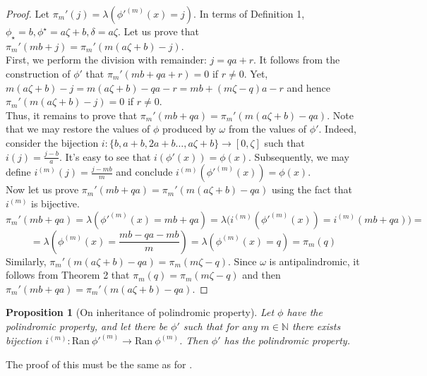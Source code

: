 \documentclass[a4paper]{article}
\theoremstyle{plain}
\newtheorem{proposition}{Proposition}[section]
\theoremstyle{definition}
\begin{document}
\begin{proof}
Let $\pi_m'(j) = \lambda(\phi'^{(m)}(x)=j)$. In terms of Definition 1, $\phi_\star = b, \phi^\star = a\zeta + b, \delta = a\zeta$. Let us prove that $\pi_m'(mb + j) = \pi_m' (m(a\zeta+b)-j)$.\\
First, we perform the division with remainder: $j = qa + r$. It follows from the construction of $\phi'$ that $\pi_m'(mb + qa + r) = 0$ if $r \ne 0$. Yet, $m(a\zeta+b)-j = m(a\zeta+b)-qa - r = mb + (m\zeta -q)a - r$ and hence $\pi_m' (m(a\zeta+b)-j) = 0$ if $r \ne 0$.\\
Thus, it remains to prove that $\pi_m'(mb + qa) = \pi_m' (m(a\zeta+b)-qa)$.
Note that we may restore the values of $\phi$ produced by $\omega$ from the values of $\phi'$. Indeed, consider the bijection $i: \{b, a + b, 2a + b \ldots, a\zeta + b\} \rightarrow [0, \zeta]$ such that $i(j) = \frac{j-b}{a}$. It's easy to see that $i(\phi'(x))=\phi(x)$. Subsequently, we may define $i^{(m)}(j) = \frac{j-mb}{m}$ and conclude $i^{(m)}(\phi'^{(m)}(x))=\phi(x)$.\\
Now let us prove $\pi_m'(mb + qa) = \pi_m' (m(a\zeta+b)-qa)$ using the fact that $i^{(m)}$ is bijective.\\
\[\pi_m'(mb + qa) = \lambda(\phi'^{(m)}(x)=mb + qa) = \lambda\big(i^{(m)}(\phi'^{(m)}(x))=i^{(m)}(mb + qa)\big)  =\]\[= \lambda(\phi^{(m)}(x)= \frac{mb-qa-mb}{m})= \lambda(\phi^{(m)}(x)= q)=\pi_m(q)\]
Similarly, $\pi_m' (m(a\zeta+b)-qa) = \pi_m(m\zeta - q)$. Since $\omega$ is antipalindromic, it follows from Theorem 2 that $\pi_m(q) = \pi_m(m \zeta - q)$ and then $\pi_m'(mb + qa) = \pi_m' (m(a\zeta+b)-qa)$.
\end{proof}
\begin{proposition}[On inheritance of polindromic property]
Let $\phi$ have the polindromic property, and let there be $\phi'$ such that for any $m \in \mathbb{N}$ there exists bijection $i^{(m)}: \mathrm{Ran}\ \phi'^{(m)} \rightarrow \mathrm {Ran}\ \phi^{(m)}$. Then $\phi'$ has the polindromic property.
\end{proposition}
The proof of this must be the same as for .
\end{document}
